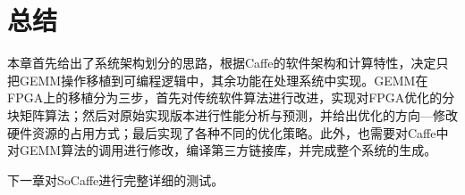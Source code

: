 \section{总结}

本章首先给出了系统架构划分的思路，根据Caffe的软件架构和计算特性，决定只把GEMM操作移植到可编程逻辑中，其余功能在处理系统中实现。GEMM在FPGA上的移植分为三步，首先对传统软件算法进行改进，实现对FPGA优化的分块矩阵算法；然后对原始实现版本进行性能分析与预测，并给出优化的方向—修改硬件资源的占用方式；最后实现了各种不同的优化策略。此外，也需要对Caffe中对GEMM算法的调用进行修改，编译第三方链接库，并完成整个系统的生成。

下一章对SoCaffe进行完整详细的测试。